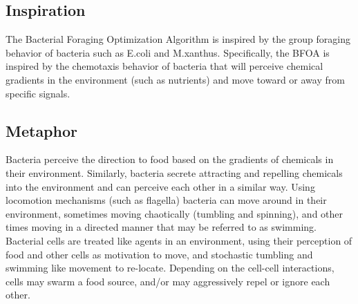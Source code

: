 \subsection{Inspiration}
The Bacterial Foraging Optimization Algorithm is inspired by the group foraging behavior of bacteria such as E.coli and M.xanthus.
Specifically, the BFOA is inspired by the chemotaxis behavior of bacteria that will perceive chemical gradients in the environment (such as nutrients) and move toward or away from specific signals.

\subsection{Metaphor}
Bacteria perceive the direction to food based on the gradients of chemicals in their environment. Similarly, bacteria secrete attracting and repelling chemicals into the environment and can perceive each other in a similar way. Using locomotion mechanisms (such as flagella) bacteria can move around in their environment, sometimes moving chaotically (tumbling and spinning), and other times moving in a directed manner that may be referred to as swimming. Bacterial cells are treated like agents in an environment, using their perception of food and other cells as motivation to move, and stochastic tumbling and swimming like movement to re-locate. Depending on the cell-cell interactions, cells may swarm a food source, and/or may aggressively repel or ignore each other.

